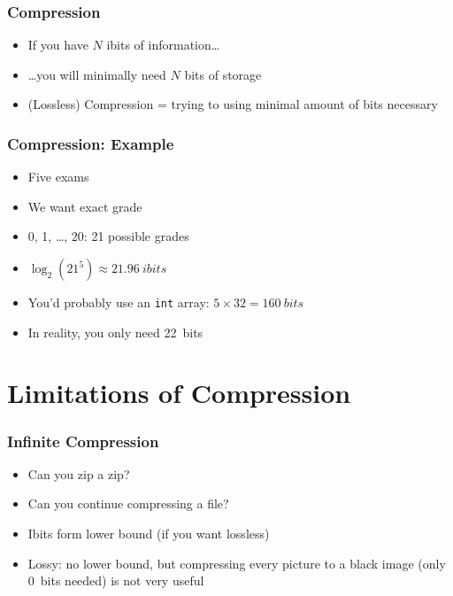 \begin{frame}
  \frametitle{Compression}
  \begin{itemize}
    \item If you have $N$ ibits of information\dots
    \item \dots you will minimally need $N$ bits of storage
    \item (Lossless) Compression = trying to using minimal amount of bits necessary
  \end{itemize}
\end{frame}

\begin{frame}
  \frametitle{Compression: Example}
  \begin{itemize}
    \item Five exams
    \item We want exact grade
    \item 0, 1, \dots, 20: 21 possible grades
    \item $\log_2(21^5) \approx \SI{21.96}{ibits}$
    \item You'd probably use an {\tt int} array: $5 \times 32 = \SI{160}{bits}$
    \item In reality, you only need \SI{22}{bits}
  \end{itemize}
\end{frame}

\section{Limitations of Compression}

\begin{frame}
  \tableofcontents[currentsection]
\end{frame}

\begin{frame}
  \frametitle{Infinite Compression}
  \begin{itemize}
    \item Can you zip a zip?
    \item Can you continue compressing a file?
    \item Ibits form lower bound (if you want lossless)
    \item Lossy: no lower bound, but compressing every picture to a black image (only \SI{0}{bits} needed) is not very useful
  \end{itemize}
\end{frame}

